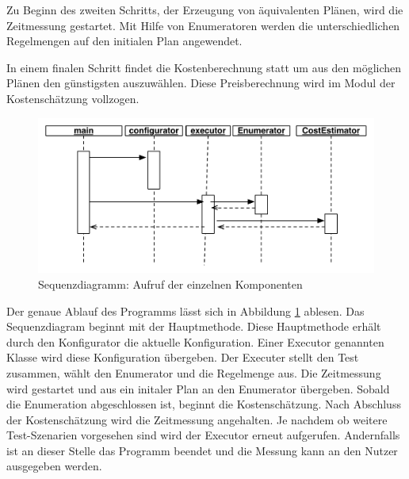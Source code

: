 Zu Beginn des zweiten Schritts, der Erzeugung von äquivalenten Plänen, wird die Zeitmessung gestartet.  Mit Hilfe von Enumeratoren werden die unterschiedlichen Regelmengen auf den initialen Plan angewendet.

In einem finalen Schritt findet die Kostenberechnung statt um aus den möglichen Plänen den günstigsten auszuwählen. Diese Preisberechnung wird im Modul der Kostenschätzung vollzogen.



\begin{figure}[ht]
  \centering
  \includegraphics[width=\textwidth]{04_Implementierung/00_media/SequenceDiagramConfiguration.pdf}
  \caption{Sequenzdiagramm: Aufruf der einzelnen Komponenten}
  \label{SequenceDiagramConfiguration}
\end{figure}


Der genaue Ablauf des Programms lässt sich in Abbildung \ref{SequenceDiagramConfiguration} ablesen. Das Sequenzdiagram beginnt mit der Hauptmethode. Diese Hauptmethode erhält durch den Konfigurator die aktuelle Konfiguration. Einer Executor genannten Klasse wird diese Konfiguration übergeben. Der Executer stellt den Test zusammen, wählt den Enumerator und die Regelmenge aus. Die Zeitmessung wird gestartet und aus ein initaler Plan an den Enumerator übergeben. Sobald die Enumeration abgeschlossen ist, beginnt die Kostenschätzung. Nach Abschluss der Kostenschätzung wird die Zeitmessung angehalten. Je nachdem ob weitere Test-Szenarien vorgesehen sind wird der Executor erneut aufgerufen. Andernfalls ist an dieser Stelle das Programm beendet und die Messung kann an den Nutzer ausgegeben werden.

